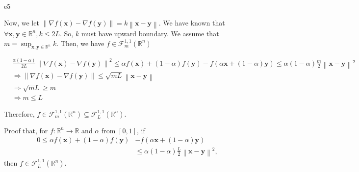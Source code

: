 \documentclass{article}
\newcommand{\xB}{\bm{x}}
\newcommand{\yB}{\bm{y}}
\newcommand{\RBB}{\mathbb{R}}
\newcommand{\FM}{\mathcal{F}}
\newcommand{\functiontype}[3]{\FM_{#1}^{#2,#3}(\RBB^n)}
\newcommand{\normgen}[1]{\left\| #1 \right\|}
\begin{document}
\begin{PROOF}{e5}
	
	

	Now, we let \(\left\| \nabla f(\bm{x}) - \nabla f(\bm{y}) \right\| = k \left\| \bm{x} - \bm{y} \right\|\). We have known that \(\forall \bm{x}, \bm{y} \in \mathbb{R}^n, k \leq 2L\). So, \(k\) must have upward boundary. We assume that \(m = \sup_{\bm{x}, \bm{y} \in \mathbb{R}^n} k\). Then, we have $f \in \mathcal{F}_{m}^{1,1}(\mathbb{R}^n)$

	\[
	\begin{aligned}
	&\frac{\alpha (1 - \alpha)}{2L} \left\| \nabla f(\bm{x}) - \nabla f(\bm{y}) \right\|^2 \leq \alpha f(\bm{x}) + (1 - \alpha) f(\bm{y}) - f(\alpha \bm{x} + (1 - \alpha) \bm{y}) \leq \alpha (1 - \alpha) \frac{m}{2} \left\| \bm{x} - \bm{y} \right\|^2\\
	&\Rightarrow \left\| \nabla f(\bm{x}) - \nabla f(\bm{y}) \right\| \leq \sqrt{mL} \left\| \bm{x} - \bm{y} \right\|\\
	&\Rightarrow \sqrt{mL} \geq m\\
	&\Rightarrow m \leq L
	\end{aligned}
	\]

	Therefore, \(f \in \mathcal{F}_{m}^{1,1}(\mathbb{R}^n) \subseteq \mathcal{F}_{L}^{1,1}(\mathbb{R}^n)\).
\end{PROOF}
\newpage
\begin{excercise}\label{e6}
	Proof that, for $f: \RBB^n \rightarrow \RBB$ and $\alpha$ from $[0,1]$,  if
\begin{align*} 
	0  \leq  \alpha f(\xB) + (1-\alpha) f(\yB)  &-  f( \alpha \xB + (1-\alpha) \yB) \nonumber \\
	&\leq \alpha (1-\alpha) \frac{L}{2} \normgen{\xB - \yB}^2,
\end{align*}
	then $f \in \functiontype{L}{1}{1}$.
\end{excercise}
\end{document}
